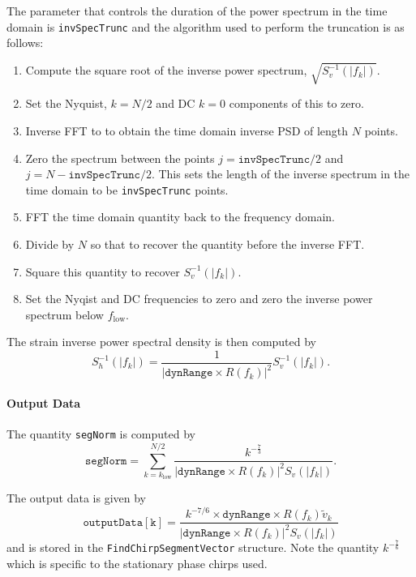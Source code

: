 The parameter that controls the duration of the power spectrum in the time
domain is \texttt{invSpecTrunc} and the algorithm used to perform the
truncation is as follows:
\begin{enumerate}
\item Compute the square root of the inverse power spectrum,
$\sqrt{S^{-1}_v(|f_k|)}$.
\item Set the Nyquist, $k = N/2$ and DC $k = 0$ components of this to zero.
\item Inverse FFT to to obtain the time domain inverse PSD of length $N$
points.
\item Zero the spectrum between the points $j = \mathtt{invSpecTrunc}/2$ and 
$j = N - \mathtt{invSpecTrunc}/2$. This sets the length of the inverse
spectrum in the time domain to be \texttt{invSpecTrunc} points.
\item FFT the time domain quantity back to the frequency domain.
\item Divide by $N$ so that to recover the quantity before the inverse FFT.
\item Square this quantity to recover $S^{-1}_v(|f_k|)$.
\item Set the Nyqist and DC frequencies to zero and zero the inverse power
spectrum below $f_{\mathrm{low}}$.
\end{enumerate}

The strain inverse power spectral density is then computed by
\begin{equation}
S^{-1}_h(|f_k|) = \frac{1}{\left|\mathtt{dynRange} \times R(f_k)\right|^2}
 S^{-1}_v(|f_k|).
\end{equation}

\paragraph*{Output Data}
The quantity \texttt{segNorm} is computed by
\begin{equation}
\mathtt{segNorm} = 
   \sum_{k = k_{\mathrm{low}}}^{N/2} \frac{k^{-\frac{7}{3}}}
   {\left|\mathtt{dynRange}\times R(f_k)\right|^2 S_v(|f_k|)}.
\end{equation}

The output data is given by
\begin{equation}
\mathtt{outputData[k]} = 
\frac{k^{-7/6} \times \mathtt{dynRange} \times R(f_k)\tilde{v}_k}
{\left|\mathtt{dynRange} \times R(f_k)\right|^2 S_v(|f_k|)}
\end{equation}
and is stored in the \texttt{FindChirpSegmentVector} structure. Note the
quantity $k^{-\frac{7}{6}}$ which is specific to the stationary phase chirps
used.

